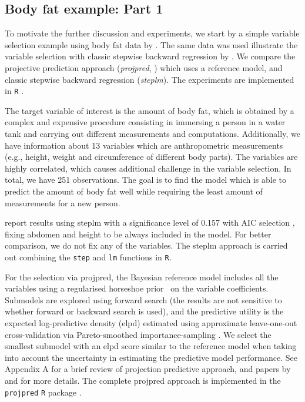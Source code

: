 \documentclass[a4]{article}
\theoremstyle{definition}
\begin{document}
\subsection{Body fat example: Part 1}
\label{bodyfat-1}

To motivate the further discussion and experiments, we start by a simple
variable selection example using body fat data by \citet{johnson1996fitting}. The same data was used illustrate the variable selection with classic stepwise backward regression by \citet{paper:bodyfat}.
We compare the projective prediction approach (\emph{projpred},
\citet{paper:projpred}) which uses a reference model, and classic
stepwise backward regression (\emph{steplm}).
The experiments are implemented in \texttt{R} \citep{Rcore2018}.

The target variable of interest is the amount of body fat, which is
obtained by a complex and expensive procedure consisting in immersing a 
person in a water tank and carrying out different measurements and computations. 
Additionally, we have information about 13
variables which are anthropometric measurements (e.g., height, weight
and circumference of different body parts). The
variables are highly correlated, which causes additional
challenge in the variable selection. In total, we have 251
observations. The goal is to find the model which is able to predict
the amount of body fat well while requiring the least amount of
measurements for a new person.

\cite{paper:bodyfat} report results using steplm with a significance
level of 0.157 with AIC selection \citep{akaike1974new}, fixing
abdomen and height to be always included in the model. For better
comparison, we do not fix any of the variables.  The steplm approach is
carried out combining the \texttt{step} and \texttt{lm} functions in \texttt{R}.

For the selection via projpred, the Bayesian reference model includes
all the variables using a regularised horseshoe prior~\citep{paper:rhs} on the
variable coefficients. Submodels are explored using
forward search (the results are not sensitive to whether forward or
backward search is used), and the predictive utility is the expected
log-predictive density (elpd) estimated using approximate leave-one-out cross-validation via Pareto-smoothed importance-sampling
\citep[PSIS-LOO-CV; ][]{paper:psis_loo}.  We select the smallest  submodel with an elpd score similar to the reference model
when taking into account the uncertainty in estimating the predictive
model performance. See Appendix A for a brief review of projection
predictive approach, and papers by \citet{paper:model_selection} and
\citet{paper:projpred} for more details. The complete projpred approach is implemented in the \texttt{projpred} \texttt{R} package \citep{Rprojpred}.
\end{document}
